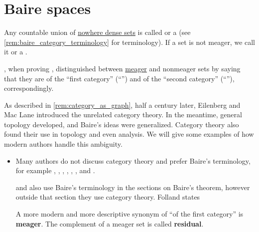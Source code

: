 \section{Baire spaces}\label{sec:baire_spaces}

\begin{definition}\label{def:meager_set}
  Any countable union of \hyperref[def:topologically_dense_set]{nowhere dense sets} is called  or a  (see \cref{rem:baire_category_terminology} for terminology). If a set is not meager, we call it  or a .
\end{definition}

\begin{remark}\label{rem:baire_category_terminology}
  \Textcite{Baire1899FonctionsDeVariablesRéelles}, when proving , distinguished between \hyperref[def:meager_set]{meager} and nonmeager sets by saying that they are of the \enquote{first category} (\enquote{}) and of the \enquote{second category} (\enquote{}), correspondingly.

  As described in \cref{rem:category_as_graph}, half a century later, Eilenberg and Mac Lane introduced the unrelated category theory. In the meantime, general topology developed, and Baire's ideas were generalized. Category theory also found their use in topology and even analysis. We will give some examples of how modern authors handle this ambiguity.

  \begin{itemize}
    \item Many authors do not discuss category theory and prefer Baire's terminology, for example
    \cite[159]{Kunen2013SetTheory},
    \cite[def. 25.1]{Willard2004GeneralTopology},
    \cite[132]{Carothers2000RealAnalysis},
    \cite[288]{HasselblattKatok1995DynamicalSystems},
    \cite[def. 3.2.1]{Sally2013Analysis},
    \cite[thm. A.58]{Lee2012SmoothManifolds},
    \cite{Rudin1987RealAndComplexAnalysis} and
    \cite[21]{КанторовичАкилов1984ФункциональныйАнализ}.

    \Textcite[258]{Birkhoff1967LatticeTheory} and \textcite[174]{Folland1999RealAnalysis} also use Baire's terminology in the sections on Baire's theorem, however outside that section they use category theory. Folland states
    \begin{displayquote}
      A more modern and more descriptive synonym of \enquote{of the first category} is \textbf{meager}. The complement of a meager set is called \textbf{residual}.
    \end{displayquote}


\end{itemize}
\end{remark}

